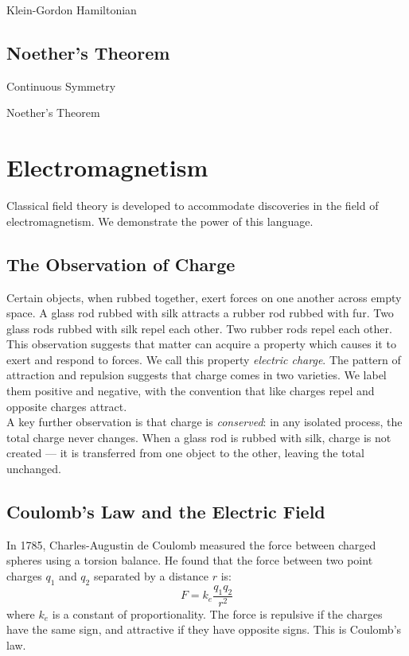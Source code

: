 \documentclass[a4paper]{article}
\begin{document}
\begin{prp}{Klein-Gordon Hamiltonian}{}
\end{prp}

\subsection{Noether's Theorem}
\begin{defn}{Continuous Symmetry}{}
\end{defn}

\begin{thm}{Noether's Theorem}{}
\end{thm}

\pagebreak
\section{Electromagnetism}
Classical field theory is developed to accommodate discoveries in the field of electromagnetism. We demonstrate the power of this language. 

\subsection*{The Observation of Charge}
Certain objects, when rubbed together, exert forces on one another across empty space. A glass rod rubbed with silk attracts a rubber rod rubbed with fur. Two glass rods rubbed with silk repel each other. Two rubber rods repel each other. \\

This observation suggests that matter can acquire a property which causes it to exert and respond to forces. We call this property \textit{electric charge}. The pattern of attraction and repulsion suggests that charge comes in two varieties. We label them positive and negative, with the convention that like charges repel and opposite charges attract. \\

A key further observation is that charge is \textit{conserved}: in any isolated process, the total charge never changes. When a glass rod is rubbed with silk, charge is not created --- it is transferred from one object to the other, leaving the total unchanged. 

\subsection*{Coulomb's Law and the Electric Field}
In 1785, Charles-Augustin de Coulomb measured the force between charged spheres using a torsion balance. He found that the force between two point charges $q_1$ and $q_2$ separated by a distance $r$ is: $$F=k_e\frac{q_1 q_2}{r^2}$$ where $k_e$ is a constant of proportionality. The force is repulsive if the charges have the same sign, and attractive if they have opposite signs. This is Coulomb's law. \\
\end{document}
